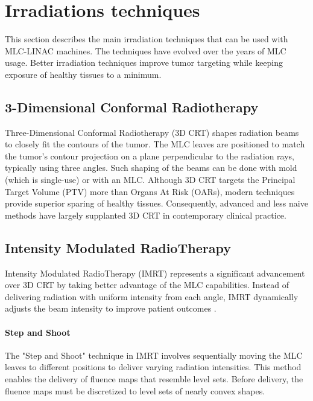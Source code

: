 


\section{Irradiations techniques}
This section describes the main irradiation techniques that can be used with MLC-LINAC machines.
The techniques have evolved over the years of MLC usage.
Better irradiation techniques improve tumor targeting while keeping exposure of healthy tissues to a minimum.

\subsection[3D-CRT]{3-Dimensional Conformal Radiotherapy}
Three-Dimensional Conformal Radiotherapy (3D CRT) shapes radiation beams to closely fit the contours of the tumor.
The MLC leaves are positioned to match the tumor's contour projection on a plane perpendicular to the radiation rays, typically using three angles.
Such shaping of the beams can be done with mold (which is single-use) or with an MLC.
Although 3D CRT targets the Principal Target Volume (PTV) more than Organs At Risk (OARs), modern techniques provide superior sparing of healthy tissues.
Consequently, advanced and less naive methods have largely supplanted 3D CRT in contemporary clinical practice.

\subsection[IMRT]{Intensity Modulated RadioTherapy}
Intensity Modulated RadioTherapy (IMRT) represents a significant advancement over 3D CRT by taking better advantage of the  MLC capabilities.
Instead of delivering radiation with uniform intensity from each angle, IMRT dynamically adjusts the beam intensity to improve patient outcomes \cite{Tubiana2000}.

\paragraph[S\&S]{Step and Shoot}
The "Step and Shoot" technique in IMRT involves sequentially moving the MLC leaves to different positions to deliver varying radiation intensities.
This method enables the delivery of fluence maps that resemble level sets. 
Before delivery, the fluence maps must be discretized to level sets of nearly convex shapes.

